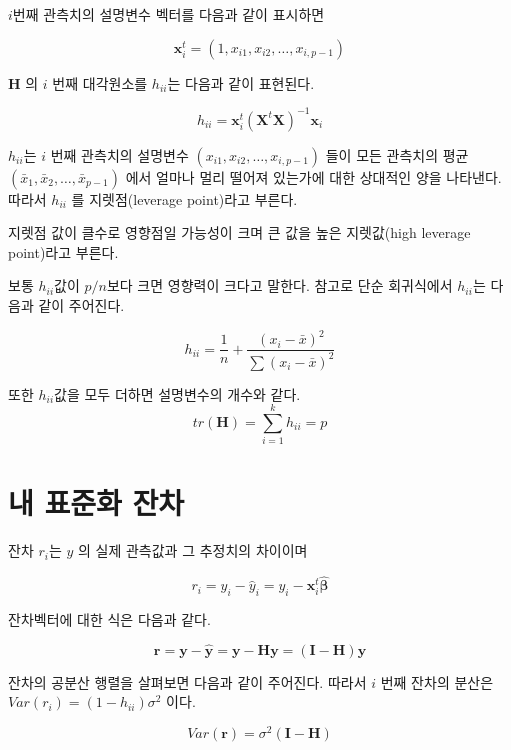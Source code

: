 \documentclass[
]{book}
\theoremstyle{definition}
\theoremstyle{definition}
\theoremstyle{definition}
\theoremstyle{definition}
\theoremstyle{remark}
\begin{document}
\(i\)번째 관측치의 설명변수 벡터를 다음과 같이 표시하면

\[\bm x_{i}^t=(1, x_{i1},x_{i2},\dots, x_{i,p-1}) \]

\(\bm H\) 의 \(i\) 번째 대각원소를 \(h_{ii}\)는 다음과 같이 표현된다.

\begin{equation}
 h_{ii} = \bm x_{i}^t (\bm X^t \bm X)^{-1}  \bm x_{i} 
\label{eq:hii}
\end{equation}

\(h_{ii}\)는 \(i\) 번째 관측치의 설명변수 \((x_{i1},x_{i2},\dots, x_{i,p-1})\)
들이 모든 관측치의 평균 \((\bar x_1, \bar x_2,\dots, \bar x_{p-1})\) 에서
얼마나 멀리 떨어져 있는가에 대한 상대적인 양을 나타낸다. 따라서 \(h_{ii}\)
를 지렛점(leverage point)라고 부른다.

지렛점 값이 클수로 영향점일 가능성이 크며 큰 값을 높은 지렛값(high
leverage point)라고 부른다.

보통 \(h_{ii}\)값이 \(p/n\)보다 크면 영향력이 크다고 말한다. 참고로 단순
회귀식에서 \(h_{ii}\)는 다음과 같이 주어진다.

\[ h_{ii} = \frac{1}{n} + \frac{ ( x_i-\bar x)^2 }{\sum (x_i-\bar x)^2} \]

또한 \(h_{ii}\)값을 모두 더하면 설명변수의 개수와 같다.
\[ tr(\bm H)=\sum_{i=1}^k h_{ii} = p \]

\hypertarget{uxb0b4-uxd45cuxc900uxd654-uxc794uxcc28}{%
\section{내 표준화 잔차}\label{uxb0b4-uxd45cuxc900uxd654-uxc794uxcc28}}

잔차 \(r_i\)는 \(y\) 의 실제 관측값과 그 추정치의 차이이며

\begin{equation}
r_i = y_i -\hat y_i  = y_i - {\bm x}_i^t \hat {\bm \beta}
\label{eq:resid}
\end{equation}

잔차벡터에 대한 식은 다음과 같다.

\begin{equation}
\bm r = \bm y - \hat {\bm y} = \bm y - \bm H \bm y = (\bm I-\bm H)\bm y 
\label{eq:residvec}
\end{equation}

잔차의 공분산 행렬을 살펴보면 다음과 같이 주어진다. 따라서 \(i\) 번째
잔차의 분산은 \(Var(r_i) = (1-h_{ii})\sigma^2\) 이다.

\begin{equation}
Var(\bm r) = \sigma^2 (\bm I-\bm H) 
\label{eq:residvar}
\end{equation}
\end{document}
